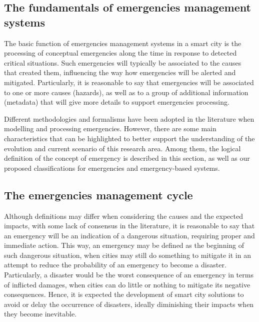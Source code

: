\begin{refsection}
\section {The fundamentals of emergencies management systems}
\label{sec3}

The basic function of emergencies management systems in a smart city is the processing of conceptual emergencies along the time in response to detected critical situations. Such emergencies will typically be associated to the causes that created them, influencing the way how emergencies will be alerted and mitigated. Particularly, it is reasonable to say that emergencies will be associated to one or more causes (hazards), as well as to a group of additional information (metadata) that will give more details to support emergencies processing.  

Different methodologies and formalisms have been adopted in the literature when modelling and processing emergencies. However, there are some main characteristics that can be highlighted to better support the understanding of the evolution and current scenario of this research area. Among them, the logical definition of the concept of emergency is described in this section, as well as our proposed classifications for emergencies and emergency-based systems.

\subsection{The emergencies management cycle}

Although definitions may differ when considering the causes and the expected impacts, with some lack of consensus in the literature, it is reasonable to say that an emergency will be an indication of a dangerous situation, requiring proper and immediate action. This way, an emergency may be defined as the beginning of such dangerous situation, when cities may still do something to mitigate it in an attempt to reduce the probability of an emergency to become a disaster. Particularly, a disaster would be the worst consequence of an emergency in terms of inflicted damages, when cities can do little or nothing to mitigate its negative consequences. Hence, it is expected the development of smart city solutions to avoid or delay the occurrence of disasters, ideally diminishing their impacts when they become inevitable. 


\end{refsection}

